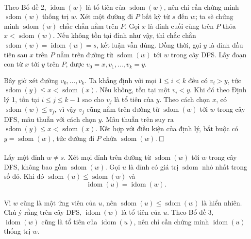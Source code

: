 \documentclass[11pt]{article}
\newcommand{\proofbox}{\ensuremath{\vcenter{\hrule height 0.45pt
  \hbox{\vrule width 0.45pt height 6pt\kern 6pt\vrule width 0.45pt}
  \hrule height 0.45pt}}}
\begin{document}
\paragraph{}
Theo Bổ đề 2, \(\operatorname{idom}(w)\) là tổ tiên của \(\operatorname{sdom}(w)\),
nên chỉ cần chứng minh \(\operatorname{sdom}(w)\) thống trị \(w\). Xét một
đường đi \(P\) bất kỳ từ \(s\) đến \(w\); ta sẽ chứng minh
\(\operatorname{sdom}(w)\) chắc chắn nằm trên \(P\). Gọi \(x\) là đỉnh cuối
cùng trên \(P\) thỏa \(x<\operatorname{sdom}(w)\). Nếu không tồn tại đỉnh như
vậy, thì chắc chắn \(\operatorname{sdom}(w)=\operatorname{idom}(w)=s\), kết
luận vẫn đúng. Đồng thời, gọi \(y\) là đỉnh đầu tiên sau \(x\) trên \(P\) nằm
trên đường từ \(\operatorname{sdom}(w)\) tới \(w\) trong cây DFS. Lấy đoạn con
từ \(x\) tới \(y\) trên \(P\), được \(v_0=x,v_1,\ldots,v_k=y\).

Bây giờ xét đường \(v_0,\ldots,v_k\). Ta khẳng định với mọi \(1\le i<k\) đều
có \(v_i>y\), tức \(\operatorname{sdom}(y)\le x<\operatorname{sdom}(x)\). Nếu
không, tồn tại một \(v_i<y\). Khi đó theo Định lý 1, tồn tại \(i\le j\le k-1\)
sao cho \(v_j\) là tổ tiên của \(y\). Theo cách chọn \(x\), có
\(\operatorname{sdom}(w)\le v_j\), vì vậy \(v_j\) cũng nằm trên đường từ
\(\operatorname{sdom}(w)\) tới \(w\) trong cây DFS, mâu thuẫn với cách chọn
\(y\). Mâu thuẫn trên suy ra
\(\operatorname{sdom}(y)\le x<\operatorname{sdom}(x)\). Kết hợp với điều kiện
của định lý, bắt buộc có \(y=\operatorname{sdom}(w)\), tức đường đi \(P\) chứa
\(\operatorname{sdom}(w)\). \proofbox

\paragraph{}
Lấy một đỉnh \(w\ne s\). Xét mọi đỉnh trên đường từ \(\operatorname{sdom}(w)\)
tới \(w\) trong cây DFS, không bao gồm \(\operatorname{sdom}(w)\). Gọi \(u\)
là đỉnh có giá trị \(\operatorname{sdom}\) nhỏ nhất trong số đó. Khi đó
\(\operatorname{sdom}(u)\le \operatorname{sdom}(w)\) và
\[
\operatorname{idom}(u)=\operatorname{idom}(w).
\]

\paragraph{}
Vì \(w\) cũng là một ứng viên của \(u\), nên
\(\operatorname{sdom}(u)\le \operatorname{sdom}(w)\) là hiển nhiên. Chú ý rằng
trên cây DFS, \(\operatorname{idom}(w)\) là tổ tiên của \(u\). Theo Bổ đề 3,
\(\operatorname{idom}(w)\) cũng là tổ tiên của \(\operatorname{idom}(u)\), nên
chỉ cần chứng minh \(\operatorname{idom}(u)\) thống trị \(w\).
\end{document}
